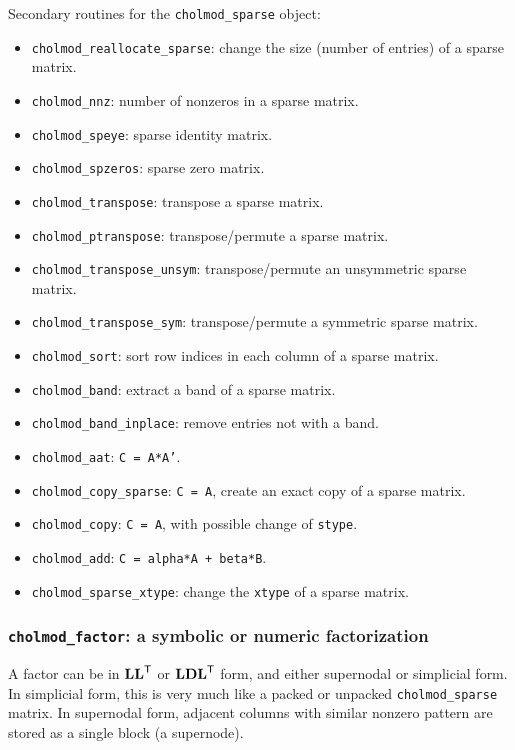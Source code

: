 \documentclass[11pt]{article}
\newcommand{\m}[1]{{\bf{#1}}}       %
\newcommand{\tr}{^{\sf T}}          %
\begin{document}
\noindent Secondary routines for the {\tt cholmod\_sparse} object:
    \begin{itemize}
    \item {\tt cholmod\_reallocate\_sparse}: change the size (number of entries) of a sparse matrix.
    \item {\tt cholmod\_nnz}: number of nonzeros in a sparse matrix.
    \item {\tt cholmod\_speye}: sparse identity matrix.
    \item {\tt cholmod\_spzeros}: sparse zero matrix.
    \item {\tt cholmod\_transpose}: transpose a sparse matrix.
    \item {\tt cholmod\_ptranspose}: transpose/permute a sparse matrix.
    \item {\tt cholmod\_transpose\_unsym}: transpose/permute an unsymmetric sparse matrix.
    \item {\tt cholmod\_transpose\_sym}: transpose/permute a symmetric sparse matrix.
    \item {\tt cholmod\_sort}: sort row indices in each column of a sparse matrix.
    \item {\tt cholmod\_band}: extract a band of a sparse matrix.
    \item {\tt cholmod\_band\_inplace}: remove entries not with a band.
    \item {\tt cholmod\_aat}: {\tt C = A*A'}.
    \item {\tt cholmod\_copy\_sparse}: {\tt C = A}, create an exact copy of a sparse matrix.
    \item {\tt cholmod\_copy}: {\tt C = A}, with possible change of {\tt stype}.
    \item {\tt cholmod\_add}: {\tt C = alpha*A + beta*B}.
    \item {\tt cholmod\_sparse\_xtype}: change the {\tt xtype} of a sparse matrix.
    \end{itemize}

\newpage \subsubsection{{\tt cholmod\_factor}: a symbolic or numeric factorization}

    A factor can be in $\m{LL}\tr$ or $\m{LDL}\tr$ form, and either supernodal
    or simplicial form.  In simplicial form, this is very much like a
    packed or unpacked {\tt cholmod\_sparse} matrix.  In supernodal
    form, adjacent columns with similar nonzero pattern are stored as
    a single block (a supernode).
\end{document}
